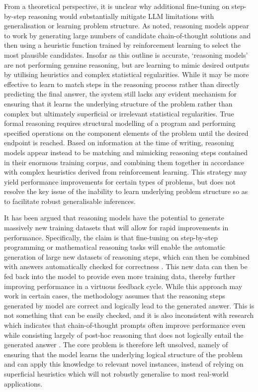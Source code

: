 \documentclass{article}
\begin{document}
From a theoretical perspective, it is unclear why additional fine-tuning on step-by-step reasoning would substantially mitigate LLM limitations with generalisation or learning problem structure. As noted, reasoning models appear to work by generating large numbers of candidate chain-of-thought solutions and then using a heuristic function trained by reinforcement learning to select the most plausible candidates. Insofar as this outline is accurate, ‘reasoning models’ are not performing genuine reasoning, but are learning to mimic desired outputs by utilising heuristics and complex statistical regularities. While it may be more effective to learn to match steps in the reasoning process rather than directly predicting the final answer, the system still lacks any evident mechanism for ensuring that it learns the underlying structure of the problem rather than complex but ultimately superficial or irrelevant statistical regularities. True formal reasoning requires structural modelling of a program and performing specified operations on the component elements of the problem until the desired endpoint is reached. Based on information at the time of writing, reasoning models appear instead to be matching and mimicking reasoning steps contained in their enormous training corpus, and combining them together in accordance with complex heuristics derived from reinforcement learning. This strategy may yield performance improvements for certain types of problems, but does not resolve the key issue of the inability to learn underlying problem structure so as to facilitate robust generalisable inferences.

It has been argued that reasoning models have the potential to generate massively new training datasets that will allow for rapid improvements in performance. Specifically, the claim is that fine-tuning on step-by-step programming or mathematical reasoning tasks will enable the automatic generation of large new datasets of reasoning steps, which can then be combined with answers automatically checked for correctness \citep{todd2025teaching}. This new data can then be fed back into the model to provide even more training data, thereby further improving performance in a virtuous feedback cycle. While this approach may work in certain cases, the methodology assumes that the reasoning steps generated by model are correct and logically lead to the generated answer. This is not something that can be easily checked, and it is also inconsistent with research which indicates that chain-of-thought prompts often improve performance even while consisting largely of post-hoc reasoning that does not logically entail the generated answer \citep{lanham2023measuring, stechly2024chain}. The core problem is therefore left unsolved, namely of ensuring that the model learns the underlying logical structure of the problem and can apply this knowledge to relevant novel instances, instead of relying on superficial heuristics which will not robustly generalise to most real-world applications.
\end{document}
